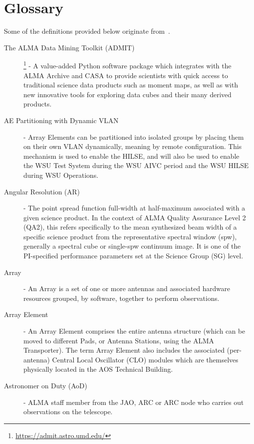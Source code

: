 \section{Glossary}
\label{sec:glossary}

Some of the definitions provided below originate from~\cite{dp}.

\begin{description}
\item[The ALMA Data Mining Toolkit (ADMIT)]\footnote{\url{https://admit.astro.umd.edu/}} - A value-added Python software package which  integrates with the ALMA Archive and CASA to provide scientists with quick access to traditional science data products such as moment maps, as well as with new innovative tools for exploring data cubes and their many derived products.
\item[AE Partitioning with Dynamic VLAN] - Array Elements can be partitioned into isolated groups by placing them on their own VLAN dynamically, meaning by remote configuration.  This mechanism is used to enable the \ac{HILSE}, and will also be used to enable the WSU Test System during the WSU AIVC period and the WSU HILSE during WSU Operations.
\item[Angular Resolution (AR)] - The point spread function  full-width at half-maximum associated with a given science product. In the context of ALMA Quality Assurance Level 2 (QA2), this refers specifically to the mean synthesized beam width of a specific science product from the representative spectral window (spw), generally a spectral cube or single-spw continuum image. It is one of the PI-specified performance parameters set at the Science Group (SG) level.
\item[Array] - An Array is a set of one or more antennas and associated hardware resources grouped, by software, together to perform observations.
\item[Array Element] - An Array Element comprises the entire antenna structure (which can be moved to different Pads, or Antenna Stations, using the ALMA Transporter). The term Array Element also includes the associated (per-antenna) Central Local Oscillator (CLO) modules which are themselves physically located in the AOS Technical Building.
\item[Astronomer on Duty (AoD)] - ALMA staff member from the JAO, ARC or ARC node who carries out observations on the telescope. 


\end{description}
